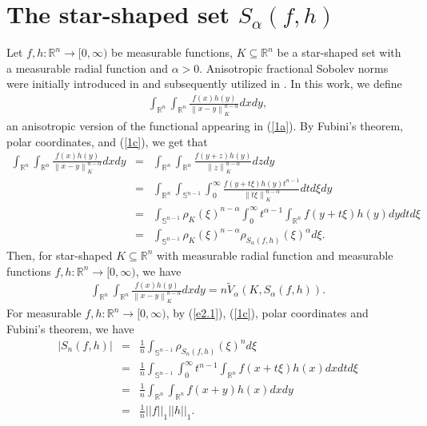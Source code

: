 \documentclass[preprint,12pt]{elsarticle}
\begin{document}
\section{The star-shaped set ${S}_{\alpha }(f,h)$}\label{s5}
Let $f, h: \mathbb{R}^n \to [0, \infty)$ be measurable functions, $K \subseteq \mathbb{R}^n$ be a star-shaped set with a measurable radial function and $\alpha > 0$. Anisotropic fractional Sobolev norms were initially introduced in \cite{M. Ludwig14,M. Ludwig2014} and subsequently utilized in \cite{JM22}. In this work, we define
\begin{eqnarray*}
	\int_{\mathbb{R}^n}\int_{\mathbb{R}^n}\frac{f(x)h(y)}{{\left \| x-y\right \|}_{K }^{n-\alpha}}dxdy,
\end{eqnarray*}
an anisotropic version of the functional appearing in (\ref{1a}). By Fubini’s theorem, polar coordinates, and (\ref{1c}), we get that 
\begin{eqnarray*}
\int_{\mathbb{R}^n}\int_{\mathbb{R}^n}\frac{f(x)h(y)}{{\left \| x-y\right\|}_{K}^{n-\alpha}}dxdy&=&\int_{\mathbb{R}^n}\int_{\mathbb{R}^n}\frac{f(y+z)h(y)}{{\left\|z\right\|}_{K }^{n-\alpha}}dzdy\nonumber\\
&=&\int_{\mathbb{R}^n}\int_{\mathbb{S}^{n-1}}\int_{0}^{\infty }\frac{f(y+t\xi )h(y){t}^{n-1}}{{\left \| t\xi\right \|}_{K }^{n-\alpha}}dtd\xi dy\nonumber\\
&=&\int_{\mathbb{S}^{n-1}}{{\rho}_{K} (\xi)}^{n-\alpha}\int_{0}^{\infty }{t }^{\alpha-1}\int_{\mathbb{R}^n}f(y+t\xi )h(y)dydtd\xi\nonumber\\
&=&\int_{\mathbb{S}^{n-1}}{{\rho}_{K} (\xi)}^{n-\alpha}{{\rho}_{{S}_{\alpha }(f,h)} (\xi)}^{\alpha}d\xi.
\end{eqnarray*}
Then, for star-shaped $K\subseteq \mathbb{R}^n$ with measurable radial function and measurable functions $f,h:\mathbb{R}^n\to [0,\infty )$, we have
\begin{eqnarray}\label{3a}
\int_{\mathbb{R}^n}\int_{\mathbb{R}^n}\frac{f(x)h(y)}{{\left \| x-y\right \|}_{K }^{n-\alpha}}dxdy=n\widetilde{V}_{\alpha} (K,{S}_{\alpha }(f,h)).
\end{eqnarray}
For measurable $f,h:\mathbb{R}^n\to [0,\infty )$, by (\ref{e2.1}), (\ref{1c}), polar coordinates and Fubini’s theorem, we have
\begin{eqnarray}\label{3b}
|{S}_{n}(f,h)|&=&\frac{1}{n}\int_{\mathbb{S}^{n-1}}{{\rho}_{{S}_{n}(f,h)} (\xi)}^{n}d\xi\nonumber\\&=&\frac{1}{n}\int_{\mathbb{S}^{n-1}}\int_{0}^{\infty }{t}^{n-1}\int_{\mathbb{R}^n}f(x+t\xi )h(x)dxdtd\xi\nonumber\\
&=&\frac{1}{n}\int_{\mathbb{R}^n}\int_{\mathbb{R}^n}f(x+y )h(x)dxdy\nonumber\\
&=&\frac{1}{n}{||f||}_{1}{||h||}_{1}.
\end{eqnarray}
\end{document}
